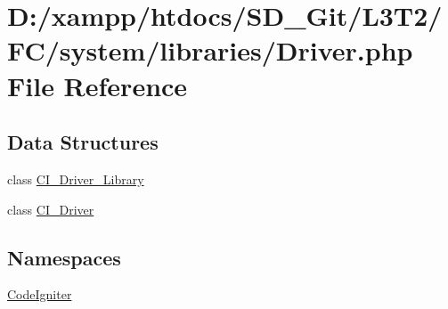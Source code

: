 \hypertarget{system_2libraries_2_driver_8php}{}\section{D\+:/xampp/htdocs/\+S\+D\+\_\+\+Git/\+L3\+T2/\+F\+C/system/libraries/\+Driver.php File Reference}
\label{system_2libraries_2_driver_8php}
\subsection*{Data Structures}
\begin{DoxyCompactItemize}
\item 
class \hyperlink{class_c_i___driver___library}{C\+I\+\_\+\+Driver\+\_\+\+Library}
\item 
class \hyperlink{class_c_i___driver}{C\+I\+\_\+\+Driver}
\end{DoxyCompactItemize}
\subsection*{Namespaces}
\begin{DoxyCompactItemize}
\item 
 \hyperlink{namespace_code_igniter}{Code\+Igniter}
\end{DoxyCompactItemize}
